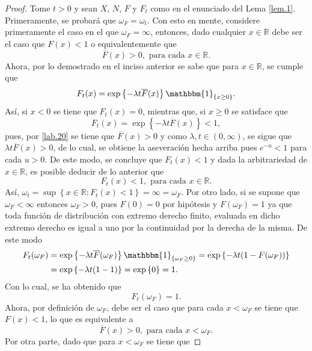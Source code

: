 \documentclass[10.5pt,notitlepage]{article}
\newcommand{\RR}{\mathbb{R}}
\newcommand{\kis}[1]{\left\{ #1 \right\}}
\theoremstyle{plain}
\begin{document}
\begin{proof}
Tome \(t > 0\) y sean  \(X\), \(N\), \(F\) y \(F_t\) como en el enunciado del Lema \ref{lem.1}. Primeramente, se probará que \(\omega_{F} = \omega_{t}\). Con esto en mente, considere primeramente el caso en el que \(\omega_F = \infty\), entonces, dado cualquier \(x \in \RR\) debe ser el caso que \(F(x) < 1\) o equivalentemente que 
\begin{equation}
\overline{F}(x)> 0, \text{ para cada } x\in \RR.    
\end{equation}\label{lab.20}
Ahora, por lo demostrado en el inciso anterior se sabe que para \(x \in \RR\), se cumple que 
\[
F_{t}(x) = \exp\kis{- \lambda t\overline{F}(x)}\mathbbm{1}_{\kis{x \geq 0}}. 
\]
Así, si \(x < 0\) se tiene que \(F_{t}(x) = 0\), mientras que, si \(x \geq 0\) se satisface que
\[
F_{t}(x) = \exp\kis{- \lambda t\overline{F}(x)} < 1,
\]
pues, por \eqref{lab.20} se tiene que \(\overline{F}(x) > 0\) y como \(\lambda,t \in (0, \infty)\), se sigue que \(\lambda t \overline{F}(x) > 0\), de lo cual, se obtiene la aseveración hecha arriba pues \(e^{-u} < 1\) para cada \(u > 0\). De este modo, se concluye que \(F_{t}(x) < 1\) y dada la arbitrariedad de \(x\in \RR\), es posible deducir de lo anterior que 
\[
F_{t}(x) < 1, \text{ para cada } x\in \RR.
\]
Así, \(\omega_{t} = \sup\kis{x \in \RR : F_{t}(x) < 1} = \infty = \omega_{F}\). Por otro lado, si se supone que \(\omega_{F} < \infty\) entonces \(\omega_{F} > 0\), pues \(F(0) = 0\) por hipótesis y \(F(\omega_{F}) = 1\) ya que toda función de distribución con extremo derecho finito, evaluada en dicho extremo derecho es igual a uno por la continuidad por la derecha de la misma. De este modo 
\begin{align*}
    F_{t}(\omega_{F}) &= \exp\kis{- \lambda t\overline{F}(\omega_{F})}\mathbbm{1}_{\kis{\omega_{F} \geq 0}}= \exp\kis{- \lambda t (1 - F(\omega_{F}))} \\
                      &=  \exp\kis{- \lambda t (1 - 1)} = \exp\kis{0}=1.
\end{align*}
Con lo cual, se ha obtenido que 
\begin{equation}\label{lab.26}
     F_{t}(\omega_{F}) = 1.
\end{equation}
Ahora, por definición de \(\omega_F\), debe ser el caso que para cada \(x < \omega_F\) se tiene que \(F(x) < 1\), lo que es equivalente a 
\begin{equation}\label{lab.27}
    \overline{F}(x) > 0, \text{ para cada } x < \omega_{F}.
\end{equation}
Por otra parte, dado que para \(x < \omega_F\) se tiene que 

\end{proof}
\end{document}
